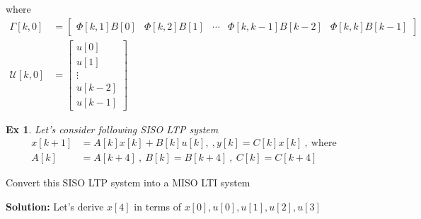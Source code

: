 \documentclass[twoside]{article}
\newtheorem{exmp}[theorem]{Ex}
\begin{document}
%
where
%
\begin{align*}
    \Gamma[k,0] &= \left[ \begin{array}{c|c|c|c|c} \Phi[k,1] B[0] & \Phi[k,2] B[1]  & \cdots & \Phi[k,k-1] B[k-2]  & \Phi[k,k] B[k-1] \end{array} \right]
\\
    \mathcal{U}[k,0] &=  \left[ \begin{array}{c} u[0] \\ u[1] \\ \vdots \\ u[k-2] \\ u[k-1]  \end{array} \right]
\end{align*}
%

\begin{exmp}
Let's consider following SISO LTP system
 \begin{align*}
  x[k+1] &= A[k] x[k] + B[k] u[k] , \ , y[k] = C[k] x[k]  \ , \   \mathrm{where} \\
  A[k] &= A[k+4]  \ , \  B[k] = B[k+4]  \ , \ C[k] = C[k+4]
 \end{align*}
\end{exmp}
%
Convert this SISO LTP system into a MISO LTI system

\textbf{Solution:} Let's derive $x[4]$ in terms of $x[0] , u[0] , u[1], u[2] , u[3]$
\end{document}
